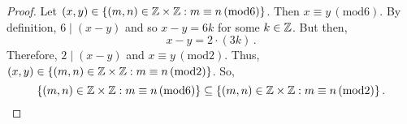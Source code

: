 \documentclass[12pt]{amsart}
\begin{document}
\begin{proof}
	Let $(x,y) \in \{ (m,n) \in \mathbb{Z} \times \mathbb{Z}: m \equiv n \, (\mathrm{mod} 6) \}$.
	Then $x\equiv y \, (\mathrm{mod} 6)$.
	By definition,
	$6 \mid (x - y)$ and so $x - y = 6k$ for some $k \in \mathbb{Z}$.
	But then,
	\begin{equation*}
		x - y = 2\cdot (3k) \,.
	\end{equation*}
	Therefore, $2 \mid (x-y)$ and $x \equiv y \, (\mathrm{mod} 2)$.
	Thus, $(x,y) \in
		\{ (m,n) \in \mathbb{Z} \times \mathbb{Z}: m \equiv n \, (\mathrm{mod} 2) \}$. So,
	\begin{equation*}
		\{ (m,n) \in \mathbb{Z} \times \mathbb{Z}: m \equiv n \, (\mathrm{mod} 6) \}
		\subseteq
		\{ (m,n) \in \mathbb{Z} \times \mathbb{Z}: m \equiv n \, (\mathrm{mod} 2) \} \,.
	\end{equation*}
\end{proof}

%
%
\end{document}
